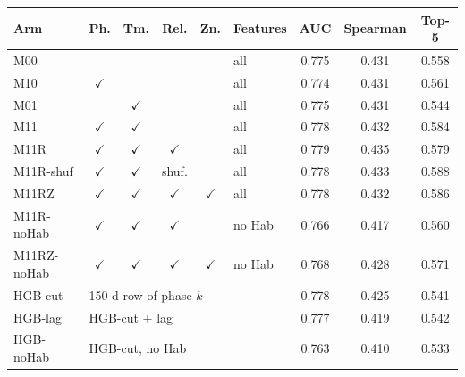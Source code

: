 \begin{tabular}{@{}l c c c c l c c c@{}}
\toprule
Arm & Ph. & Tm. & Rel. & Zn. & Features & AUC & Spearman & Top-5 \\
\midrule
M00 &  &  &  &  & all & 0.775 & 0.431 & 0.558 \\
M10 & $\checkmark$ &  &  &  & all & 0.774 & 0.431 & 0.561 \\
M01 &  & $\checkmark$ &  &  & all & 0.775 & 0.431 & 0.544 \\
M11 & $\checkmark$ & $\checkmark$ &  &  & all & 0.778 & 0.432 & 0.584 \\
M11R & $\checkmark$ & $\checkmark$ & $\checkmark$ &  & all & 0.779 & 0.435 & 0.579 \\
M11R-shuf & $\checkmark$ & $\checkmark$ & shuf. &  & all & 0.778 & 0.433 & 0.588 \\
M11RZ & $\checkmark$ & $\checkmark$ & $\checkmark$ & $\checkmark$ & all & 0.778 & 0.432 & 0.586 \\
M11R-noHab & $\checkmark$ & $\checkmark$ & $\checkmark$ &  & no Hab & 0.766 & 0.417 & 0.560 \\
M11RZ-noHab & $\checkmark$ & $\checkmark$ & $\checkmark$ & $\checkmark$ & no Hab & 0.768 & 0.428 & 0.571 \\
\midrule
HGB-cut & \multicolumn{5}{l}{150-d row of phase $k$} & 0.778 & 0.425 & 0.541 \\
HGB-lag & \multicolumn{5}{l}{HGB-cut $+$ lag} & 0.777 & 0.419 & 0.542 \\
HGB-noHab & \multicolumn{5}{l}{HGB-cut, no Hab} & 0.763 & 0.410 & 0.533 \\
\bottomrule
\end{tabular}
